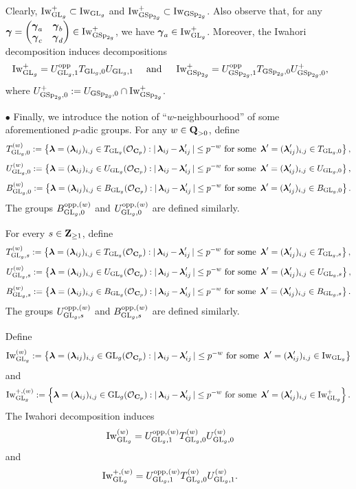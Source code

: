\begin{enumerate}
    Clearly, $\Iw_{\GL_g}^+\subset \Iw_{\GL_g}$ and $\Iw_{\GSp_{2g}}^+\subset \Iw_{\GSp_{2g}}$. Also observe that, for any $\bfgamma= \begin{pmatrix}\bfgamma_a & \bfgamma_b\\ \bfgamma_c & \bfgamma_d\end{pmatrix}\in \Iw_{\GSp_{2g}}^+$, we have $\bfgamma_a\in \Iw_{\GL_g}^+$. Moreover, the Iwahori decomposition induces decompositions 
    \[
    \Iw_{\GL_g}^+ = U_{\GL_g, 1}^{\opp}T_{\GL_g, 0}U_{\GL_g, 1} \quad \text{ and }\quad \Iw_{\GSp_{2g}}^+ = U_{\GSp_{2g}, 1}^{\opp} T_{\GSp_{2g}, 0} U_{\GSp_{2g}, 0}^+,
    \] where \( U_{\GSp_{2g}, 0}^+ := U_{\GSp_{2g}, 0}\cap \Iw_{\GSp_{2g}}^+\).

    \item[$\bullet$] Finally, we introduce the notion of ``$w$-neighbourhood'' of some aforementioned $p$-adic groups. For any $w\in \Q_{>0}$, define
\[T^{(w)}_{\GL_g, 0}:=\left\{ \bflambda=(\bflambda_{ij})_{i,j}\in T_{\GL_g}(\calO_{\C_p}):|\bflambda_{ij}-\bflambda'_{ij}|\leq p^{-w}\,\,\textrm{for some }\bflambda'=(\bflambda'_{ij})_{i,j}\in T_{\GL_g, 0}\right\},\]
\[U^{(w)}_{\GL_g, 0}:=\left\{ \bflambda=(\bflambda_{ij})_{i,j}\in U_{\GL_g}(\calO_{\C_p}):|\bflambda_{ij}-\bflambda'_{ij}|\leq p^{-w}\,\,\textrm{for some }\bflambda'=(\bflambda'_{ij})_{i,j}\in U_{\GL_g, 0}\right\},\]
\[B^{(w)}_{\GL_g, 0}:=\left\{ \bflambda=(\bflambda_{ij})_{i,j}\in B_{\GL_g}(\calO_{\C_p}):|\bflambda_{ij}-\bflambda'_{ij}|\leq p^{-w}\,\,\textrm{for some }\bflambda'=(\bflambda'_{ij})_{i,j}\in B_{\GL_g, 0}\right\}.\]
The groups $B^{\opp, (w)}_{\GL_g, 0}$ and $U^{\opp, (w)}_{\GL_g, 0}$ are defined similarly.

For every $s\in \Z_{\geq 1}$, define
\[T^{(w)}_{\GL_g, s}:=\left\{ \bflambda=(\bflambda_{ij})_{i,j}\in T_{\GL_g}(\calO_{\C_p}):|\bflambda_{ij}-\bflambda'_{ij}|\leq p^{-w}\,\,\textrm{for some }\bflambda'=(\bflambda'_{ij})_{i,j}\in T_{\GL_g, s}\right\},\]
\[U^{(w)}_{\GL_g, s}:=\left\{ \bflambda=(\bflambda_{ij})_{i,j}\in U_{\GL_g}(\calO_{\C_p}):|\bflambda_{ij}-\bflambda'_{ij}|\leq p^{-w}\,\,\textrm{for some }\bflambda'=(\bflambda'_{ij})_{i,j}\in U_{\GL_g, s}\right\},\]
\[B^{(w)}_{\GL_g, s}:=\left\{ \bflambda=(\bflambda_{ij})_{i,j}\in B_{\GL_g}(\calO_{\C_p}):|\bflambda_{ij}-\bflambda'_{ij}|\leq p^{-w}\,\,\textrm{for some }\bflambda'=(\bflambda'_{ij})_{i,j}\in B_{\GL_g, s}\right\}.\]
The groups $U^{\opp, (w)}_{\GL_g, s}$ and $B^{\opp, (w)}_{\GL_g, s}$ are defined similarly.

Define
\[\Iw^{(w)}_{\GL_g}:=\left\{ \bflambda=(\bflambda_{ij})_{i,j}\in \GL_g(\calO_{\C_p}):|\bflambda_{ij}-\bflambda'_{ij}|\leq p^{-w}\,\,\textrm{for some }\bflambda'=(\bflambda'_{ij})_{i,j}\in \Iw_{\GL_g}\right\}\]
and
\[\Iw^{+, (w)}_{\GL_g}:=\left\{ \bflambda=(\bflambda_{ij})_{i,j}\in \GL_g(\calO_{\C_p}):|\bflambda_{ij}-\bflambda'_{ij}|\leq p^{-w}\,\,\textrm{for some }\bflambda'=(\bflambda'_{ij})_{i,j}\in \Iw^+_{\GL_g}\right\}.\]
The Iwahori decomposition induces
$$\Iw_{\GL_g}^{(w)}=U_{\GL_g, 1}^{\opp,(w)}T_{\GL_g,0}^{(w)}U_{\GL_g,0}^{(w)}$$
and
$$\Iw_{\GL_g}^{+, (w)}=U_{\GL_g, 1}^{\opp,(w)}T_{\GL_g,0}^{(w)}U_{\GL_g,1}^{(w)}.$$


\end{enumerate}
